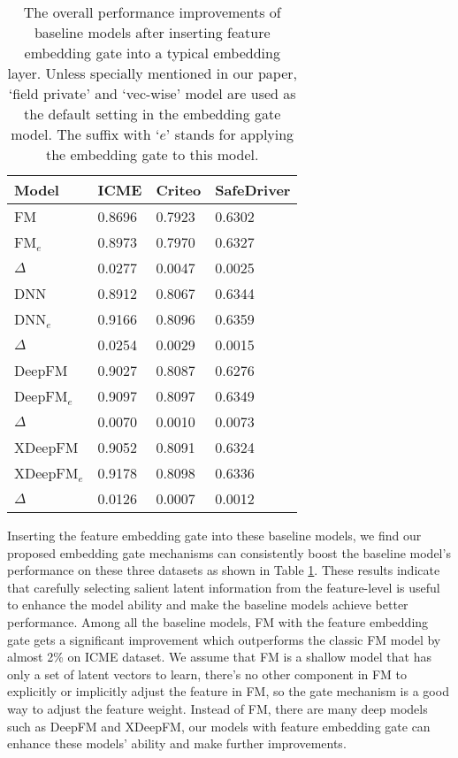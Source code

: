 \documentclass[sigconf,nonacm=true]{acmart}
\begin{document}
\begin{table}[ht]
  \centering
  \caption{The overall performance improvements of baseline models after inserting feature embedding gate into a typical embedding layer. Unless specially mentioned in our paper, `field private' and `vec-wise' model are used as the default setting in the embedding gate model. The suffix with `$e$' stands for applying the embedding gate to this model.}
  \label{table:t1}
  \begin{tabular}{llll}
  Model & ICME & Criteo & SafeDriver \\ \hline
  FM & 0.8696 & 0.7923 & 0.6302 \\
  FM$_e$ & 0.8973 & 0.7970 & 0.6327 \\
  $\Delta$ & 0.0277 & 0.0047 & 0.0025 \\ \hline
  DNN & 0.8912 & 0.8067 & 0.6344 \\
  DNN$_e$  & 0.9166 & 0.8096 & 0.6359 \\
  $\Delta$ & 0.0254 & 0.0029 & 0.0015 \\ \hline
  DeepFM & 0.9027 & 0.8087 & 0.6276 \\
  DeepFM$_e$  & 0.9097 & 0.8097 & 0.6349 \\
  $\Delta$ & 0.0070 & 0.0010 & 0.0073 \\ \hline
  XDeepFM & 0.9052 & 0.8091 & 0.6324 \\
  XDeepFM$_e$  & 0.9178 & 0.8098 & 0.6336 \\
  $\Delta$ & 0.0126 & 0.0007 & 0.0012 \tabularnewline \bottomrule
  \end{tabular}
\end{table}

Inserting the feature embedding gate into these baseline models, we find our proposed embedding gate mechanisms can  consistently boost the baseline model's performance on these three datasets as shown in Table \ref{table:t1}. 
These results indicate that carefully selecting salient latent information from the feature-level is useful to enhance the model ability and make the baseline models achieve better performance.
Among all the baseline models, FM with the feature embedding gate gets a significant improvement which outperforms the classic FM model by almost 2\% on ICME dataset.
We assume that FM is a shallow model that has only a set of latent vectors to learn, 
there's no other component in FM to explicitly or implicitly adjust the feature in FM, 
so the gate mechanism is a good way to adjust the feature weight. 
Instead of FM, there are many deep models such as DeepFM and XDeepFM, our models with feature embedding gate can enhance these models' ability and make further improvements.
\end{document}
